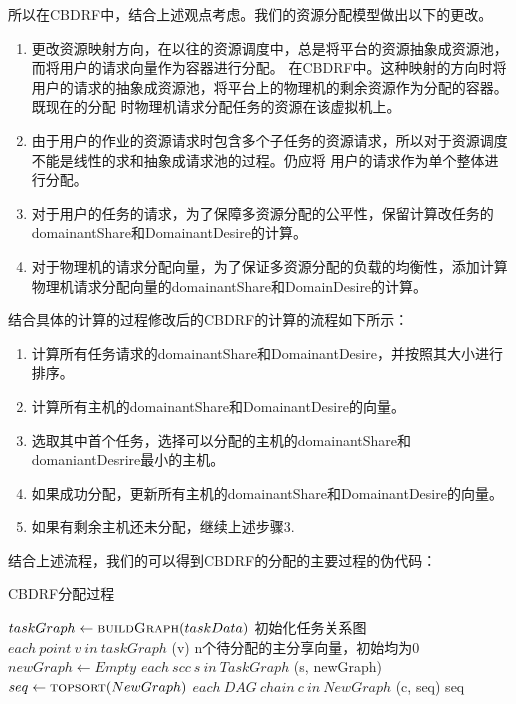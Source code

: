 所以在CBDRF中，结合上述观点考虑。我们的资源分配模型做出以下的更改。
\begin{enumerate}
\item	更改资源映射方向，在以往的资源调度中，总是将平台的资源抽象成资源池，而将用户的请求向量作为容器进行分配。
在CBDRF中。这种映射的方向时将用户的请求的抽象成资源池，将平台上的物理机的剩余资源作为分配的容器。既现在的分配
时物理机请求分配任务的资源在该虚拟机上。
\item	由于用户的作业的资源请求时包含多个子任务的资源请求，所以对于资源调度不能是线性的求和抽象成请求池的过程。仍应将
用户的请求作为单个整体进行分配。
\item 对于用户的任务的请求，为了保障多资源分配的公平性，保留计算改任务的domainantShare和DomainantDesire的计算。
\item 对于物理机的请求分配向量，为了保证多资源分配的负载的均衡性，添加计算物理机请求分配向量的domainantShare和DomainDesire的计算。
\end{enumerate}

结合具体的计算的过程修改后的CBDRF的计算的流程如下所示：
\begin{enumerate}
\item 计算所有任务请求的domainantShare和DomainantDesire，并按照其大小进行排序。	

\item	计算所有主机的domainantShare和DomainantDesire的向量。
\item 选取其中首个任务，选择可以分配的主机的domainantShare和domaniantDesrire最小的主机。
\item 如果成功分配，更新所有主机的domainantShare和DomainantDesire的向量。
\item 如果有剩余主机还未分配，继续上述步骤3.
\end{enumerate}

结合上述流程，我们的可以得到CBDRF的分配的主要过程的伪代码：
\begin{algorithm} 
\caption {CBDRF分配过程} 
\begin{codebox}
\li	$taskGraph \leftarrow \textnormal{\scshape buildGraph}(taskData)$ \RComment 初始化任务关系图
\li	\For $each \ point \ v \ in \ taskGraph$    
\li	\Do	
		(v)				\RComment n个待分配的主分享向量，初始均为0
	\End
\li	$newGraph \leftarrow Empty$
\li	\For $each \ scc \ s \ in \ TaskGraph$
\li	\Do
		(s, newGraph)
	\End
\li	$seq \leftarrow \textnormal{\scshape topsort}(NewGraph)$
\li	\For $each \ DAG \ chain \ c \ in \ NewGraph$
\li	\Do	
		(c, seq)
	\End 
\li	\Return seq
\end{codebox}
\end{algorithm} 
